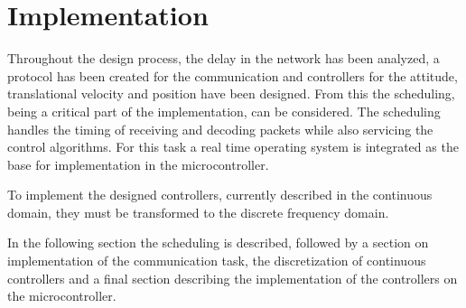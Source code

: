 \chapter{Implementation}
Throughout the design process, the delay in the network has been analyzed, a protocol has been created for the communication and controllers for the attitude, translational velocity and position have been designed. From this the scheduling, being a critical part of the implementation, can be considered. The scheduling handles the timing of receiving and decoding packets while also servicing the control algorithms. For this task a real time operating system is integrated as the base for implementation in the microcontroller.

To implement the designed controllers, currently described in the continuous domain, they must be transformed to the discrete frequency domain.

In the following section the scheduling is described, followed by a section on implementation of the communication task, the discretization of continuous controllers and a final section describing the implementation of the controllers on the microcontroller.